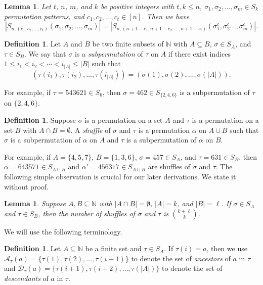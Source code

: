 \documentclass[11pt]{article}
\newtheorem{lemma}[theorem]{Lemma}
\theoremstyle{definition}
\newtheorem{definition}[theorem]{Definition}
\numberwithin{equation}{section}
\begin{document}
\begin{lemma}\label{lemma:complements}
Let $t$, $n$, $m$, and $k$ be positive integers with $t,k\leq n$, $\sigma_1,\sigma_2,\dots,\sigma_m\in S_k$ permutation patterns, and $c_1,c_2,\ldots,c_t\in[n]$. Then we have \[|S_{n,(c_1,c_2,\ldots,c_t)}(\sigma_1,\sigma_2,\ldots,\sigma_m)|=|S_{n,(n+1-c_1,n+1-c_2,\ldots,n+1-c_t)}(\sigma_1^c,\sigma_2^c\ldots,\sigma_m^c)|.\]
\end{lemma}

\begin{definition}
    Let $A$ and $B$ be two finite subsets of $\mathbb{N}$ with $A\subseteq B$, $\sigma\in S_A$, and $\tau\in S_B$. We say that $\sigma$ is a 
{\em subpermutation} of $\tau$ on $A$ if 
there exist indices $1 \leq i_1<i_2<\cdots<i_{|A|} \leq |B|$ such that
    \[
    (\tau(i_1),\tau(i_2),\ldots,\tau(i_{|A|}))=(\sigma(1),\sigma(2),\ldots,\sigma(|A|)).
    \]
\end{definition}
For example, if  $\tau=543621\in S_6$, 
then $\sigma=462\in S_{\{2,4,6\}}$ is a subpermutation of $\tau$ on $\{2,4,6\}$.

\begin{definition}
    Suppose $\sigma$ is a permutation on a set $A$ and $\tau$ is a permutation on 
a set $B$ with $A\cap B=\emptyset$.
A {\em shuffle} of $\sigma$ and $\tau$ is a permutation $\alpha$ on $A\cup B$ 
such that $\sigma$ is a subpermutation of $\alpha$ on $A$ and $\tau$ 
is a subpermutation of $\alpha$ on $B$.
\end{definition} 
For example, if $A= \{4,5,7\}$, 
$B=\{1,3,6\}$,
$\sigma=457\in S_A$, and $\tau=631\in S_B$, then 
$\alpha=643571\in S_{A\cup B}$ and $\alpha'=456317\in S_{A\cup B}$ are shuffles of $\sigma$ and $\tau$. The 
following simple observation is crucial for our later derivations. We state it without proof.
\begin{lemma}
Suppose $A,B\subseteq \mathbb{N}$ with $|A\cap B|=\emptyset$, $|A|=k$, and $|B|=\ell$. If $\sigma\in S_A$ and $\tau\in S_B$, then the number of shuffles of $\sigma$ and $\tau$ is $\binom{k+\ell}{k}$.
\end{lemma}

We will use the following terminology. 
\begin{definition}
Let $A\subseteq\mathbb{N}$ be 
a finite set and $\tau\in S_{A}$. If $\tau(i)=a$, then we 
use $\mathcal{A}_\tau(a)=\{\tau(1),\tau(2),\ldots,\tau(i-1)\}$ to denote the set 
of {\em ancestors} of $a$ in $\tau$ and $\mathcal{D}_\tau(a)=\{\tau(i+1),\tau(i+2),\ldots,\tau(|A|)\}$ 
to denote the set of {\em descendants} of $a$ in $\tau$. 
\end{definition}
\end{document}
